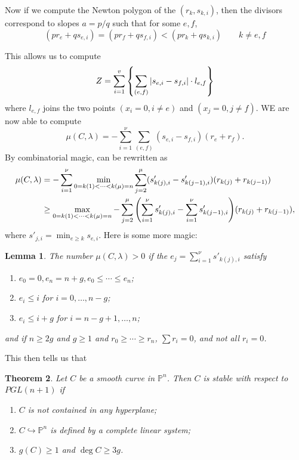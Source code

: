 \documentclass[leqno, openany]{memoir}
\newtheorem{thm}{Theorem}[section]
\newtheorem{lem}[thm]{Lemma}
\theoremstyle{definition}
\theoremstyle{remark}
\theoremstyle{plain}
\theoremstyle{definition}
\theoremstyle{remark}
\renewcommand{\P}{\mathbb{P}}
\begin{document}
Now if we compute the Newton polygon of the $(r_k, s_{k,i})$, then the divisors correspond to slopes $a = p/q$ such that for some $e,f$, 
\begin{equation}
    (p r_e + q s_{e,i}) = (p r_f + q s_{f,i}) < (p r_k + q s_{k,i}) \qquad k \neq e,f
\end{equation}

This allows us to compute
\[ Z = \sum_{i=1}^v \qty{\sum_{\substack{(e,f)}} \abs{s_{e,i} - s_{f,i}} \cdot l_{e,f}} \]
where $l_{e,f}$ joins the two points $(x_i =0, i \neq e)$ and $(x_j = 0, j \neq f)$. WE are now able to compute
\[ \mu(C, \lambda) = - \sum_{i=1}^{\nu} \sum_{(e,f)} (s_{e,i} - s_{f,i}) (r_e + r_f). \]
By combinatorial magic, can be rewritten as 
\begin{align*}
    \mu(C, \lambda) &= - \sum_{i=1}^{\nu} \min_{0 = k(1) < \cdots < k(\mu) = n} \sum_{j=2}^{\mu} (s'_{k(j), i} - s'_{k(j-1), i}) (r_{k(j)} + r_{k(j-1)}) \\
                    &\geq \max_{0 = k(1) < \cdots < k(\mu) = n} - \sum_{j=2}^{\mu} \qty(\sum_{i=1}^{\nu} s'_{k(j), i} - \sum_{i=1}^{\nu} s'_{k(j-1), i} ) (r_{k(j)} + r_{k(j-1)}),
\end{align*}
where $s'_{j,i} = \min_{e \geq k} s_{e,i}$. Here is some more magic:

\begin{lem}
    The number $\mu(C, \lambda) > 0$ if the $e_j = \sum_{i=1}^{\nu} s'_{k(j), i}$ satisfy
    \begin{enumerate}
        \item $e_0 = 0, e_n = n+g, e_0 \leq \cdots \leq e_n$;
        \item $e_i \leq i$ for $i = 0, \ldots, n-g$;
        \item $e_i \leq i + g$ for $i = n-g+1, \ldots, n$;
    \end{enumerate}
    and if $n \geq 2g$ and $g\geq 1$ and $r_0 \geq \cdots \geq r_n$, $\sum r_i = 0$, and not all $r_i = 0$.
\end{lem}

This then tells us that

\begin{thm}
    Let $C$ be a smooth curve in $\P^n$. Then $C$ is stable with respect to $PGL(n+1)$ if
    \begin{enumerate}
        \item $C$ is not contained in any hyperplane;
        \item $C \hookrightarrow \P^n$ is defined by a complete linear system;
        \item $g(C) \geq 1$ and $\deg C \geq 3g$.
    \end{enumerate}
\end{thm}
\end{document}
